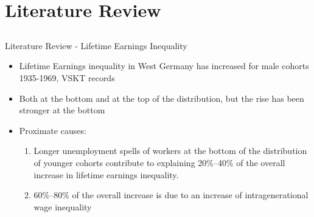 \documentclass[hyperref={bookmarks=false}]{beamer}
\let\oldcite=\cite
\renewcommand{\cite}[1]{\textcolor[rgb]{.0,.2,.7}{\oldcite{#1}}}
\begin{document}


\section{Literature Review}
\subsection{}

\begin{frame}
\end{frame}

\begin{frame}{Literature Review - Lifetime Earnings Inequality}
\cite{BoCo15}
\begin{itemize}
\setlength{\itemsep}{0.5 cm}
\item Lifetime Earnings inequality in West Germany has increased for male cohorts 1935-1969, VSKT records
\item Both at the bottom and at the top of the distribution, but the rise has been
stronger at the bottom
\item Proximate causes:
\begin{enumerate}
\vfill
\item Longer unemployment spells of workers at the bottom of the
distribution of younger cohorts contribute to explaining 20\%–40\%
of the overall increase in lifetime earnings inequality.
\vfill
\item 60\%–80\%
of the overall increase is due to an increase of intragenerational wage inequality
\end{enumerate}
\end{itemize}
\end{frame}
\end{document}
